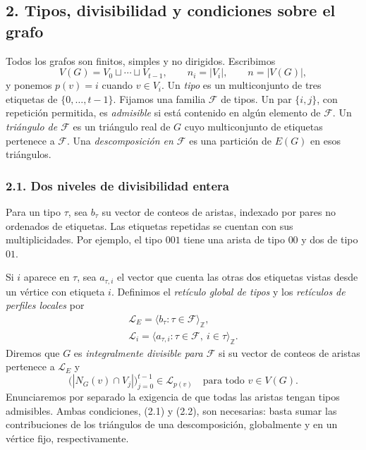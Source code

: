 \documentclass[spanish,11pt,a4paper]{article}
\begin{document}
\subsection{2. Tipos, divisibilidad y condiciones sobre el grafo}\label{tipos-divisibilidad-y-condiciones-sobre-el-grafo}

Todos los grafos son finitos, simples y no dirigidos. Escribimos \[V(G)=V_0\sqcup\cdots\sqcup V_{t-1},\qquad n_i=|V_i|,\qquad n=|V(G)|,\] y ponemos \(p(v)=i\) cuando \(v\in V_i\). Un \emph{tipo} es un multiconjunto de tres etiquetas de \(\{0,\ldots,t-1\}\). Fijamos una familia \(\mathcal F\) de tipos. Un par \(\{i,j\}\), con repetición permitida, es \emph{admisible} si está contenido en algún elemento de \(\mathcal F\). Un \emph{triángulo de \(\mathcal F\)} es un triángulo real de \(G\) cuyo multiconjunto de etiquetas pertenece a \(\mathcal F\). Una \emph{descomposición en \(\mathcal F\)} es una partición de \(E(G)\) en esos triángulos.

\subsubsection{2.1. Dos niveles de divisibilidad entera}\label{dos-niveles-de-divisibilidad-entera}

Para un tipo \(\tau\), sea \(b_\tau\) su vector de conteos de aristas, indexado por pares no ordenados de etiquetas. Las etiquetas repetidas se cuentan con sus multiplicidades. Por ejemplo, el tipo \(001\) tiene una arista de tipo \(00\) y dos de tipo \(01\).

Si \(i\) aparece en \(\tau\), sea \(a_{\tau,i}\) el vector que cuenta las otras dos etiquetas vistas desde un vértice con etiqueta \(i\). Definimos el \emph{retículo global de tipos} y los \emph{retículos de perfiles locales} por \[\begin{gathered}
\mathcal L_E=\langle b_\tau:\tau\in\mathcal F\rangle_{\mathbb Z},
\\
\mathcal L_i=\langle a_{\tau,i}:\tau\in\mathcal F,\ i\in\tau\rangle_{\mathbb Z}.
\end{gathered}
\tag{2.1}\] Diremos que \(G\) es \emph{integralmente divisible para \(\mathcal F\)} si su vector de conteos de aristas pertenece a \(\mathcal L_E\) y \[\bigl(|N_G(v)\cap V_j|\bigr)_{j=0}^{t-1}\in\mathcal L_{p(v)}
\quad\text{para todo }v\in V(G).
\tag{2.2}\] Enunciaremos por separado la exigencia de que todas las aristas tengan tipos admisibles. Ambas condiciones, (2.1) y (2.2), son necesarias: basta sumar las contribuciones de los triángulos de una descomposición, globalmente y en un vértice fijo, respectivamente.
\end{document}
